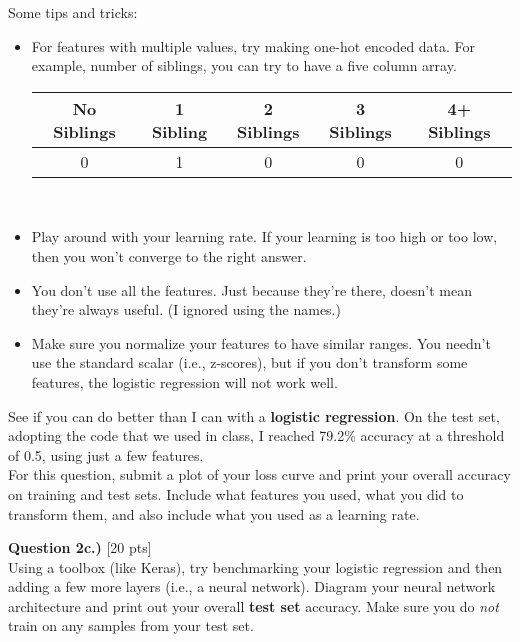 \documentclass[paper=a4, fontsize=11pt]{scrartcl} %
\begin{document}
Some tips and tricks:

\begin{itemize}
    \item For features with multiple values, try making one-hot encoded data. For example, number of siblings, you can try to have a five column array. \\
    
    \begin{tabular}{|c|c|c|c|c|}
        \hline
         No Siblings & 1 Sibling & 2 Siblings & 3 Siblings & 4+ Siblings  \\
         \hline
                0    &    1      &      0     &       0  &    0\\
        \hline
    \end{tabular} \\
    \item Play around with your learning rate. If your learning is too high or too low, then you won't converge to the right answer.
    \item You don't use all the features. Just because they're there, doesn't mean they're always useful. (I ignored using the names.)
    \item Make sure you normalize your features to have similar ranges. You needn't use the standard scalar (i.e., z-scores), but if you don't transform some features, the logistic regression will not work well.
\end{itemize}

See if you can do better than I can with a \textbf{logistic regression}. On the test set, adopting the code that we used in class, I reached 79.2\% accuracy at a threshold of 0.5, using just a few features. \\

For this question, submit a plot of your loss curve and print your overall accuracy on training and test sets. Include what features you used, what you did to transform them, and also include what you used as a learning rate.

\vspace{1cm}
{\Large \textbf{Question 2c.) }[20 pts] } \\

Using a toolbox (like Keras), try benchmarking your logistic regression and then adding a few more layers (i.e., a neural network). Diagram your neural network architecture and print out your overall \textbf{test set} accuracy. Make sure you do \emph{not} train on any samples from your test set.
\end{document}
